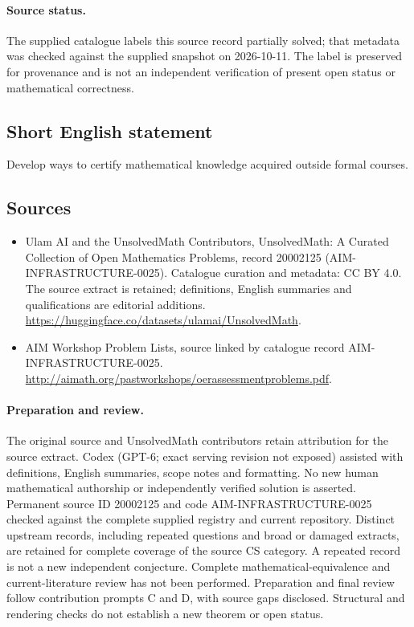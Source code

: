 \documentclass[11pt]{article}
\begin{document}
\paragraph{Source status.}
The supplied catalogue labels this source record partially solved; that metadata was checked against the supplied snapshot on 2026-10-11. The label is preserved for provenance and is not an independent verification of present open status or mathematical correctness.
\subsection{Short English statement}
Develop ways to certify mathematical knowledge acquired outside formal courses.
\subsection{Sources}
\begin{itemize}
\item[\hypertarget{source:20002125:1}{S1}] Ulam AI and the UnsolvedMath Contributors, UnsolvedMath: A Curated Collection of Open Mathematics Problems, record 20002125 (AIM-INFRASTRUCTURE-0025). Catalogue curation and metadata: CC BY 4.0. The source extract is retained; definitions, English summaries and qualifications are editorial additions.
\url{https://huggingface.co/datasets/ulamai/UnsolvedMath}.
\item[\hypertarget{source:20002125:2}{S2}] AIM Workshop Problem Lists, source linked by catalogue record AIM-INFRASTRUCTURE-0025.
\url{http://aimath.org/pastworkshops/oerassessmentproblems.pdf}.
\end{itemize}
\paragraph{Preparation and review.}
The original source and UnsolvedMath contributors retain attribution for the source extract. Codex (GPT-6; exact serving revision not exposed) assisted with definitions, English summaries, scope notes and formatting. No new human mathematical authorship or independently verified solution is asserted. Permanent source ID 20002125 and code AIM-INFRASTRUCTURE-0025 checked against the complete supplied registry and current repository. Distinct upstream records, including repeated questions and broad or damaged extracts, are retained for complete coverage of the source CS category. A repeated record is not a new independent conjecture. Complete mathematical-equivalence and current-literature review has not been performed. Preparation and final review follow contribution prompts C and D, with source gaps disclosed. Structural and rendering checks do not establish a new theorem or open status.
\label{end:20002125}
\end{document}
